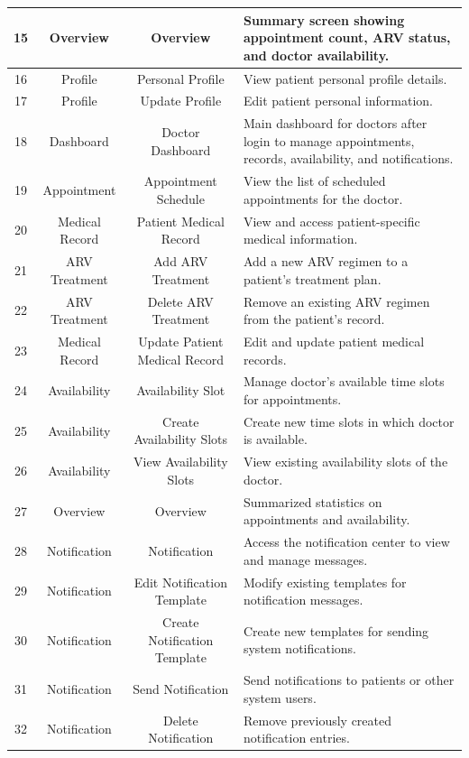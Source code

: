\documentclass[12pt,a4paper]{article}
\begin{document}
\begin{longtable}{|c|c|c|p{8.5cm}|}
\hline
15 & Overview & Overview & Summary screen showing appointment count, ARV status, and doctor availability. \\
\hline
16 & Profile & Personal Profile & View patient personal profile details. \\
\hline
17 & Profile & Update Profile & Edit patient personal information. \\
\hline
18 & Dashboard & Doctor Dashboard & Main dashboard for doctors after login to manage appointments, records, availability, and notifications. \\
\hline
19 & Appointment & Appointment Schedule & View the list of scheduled appointments for the doctor. \\
\hline
20 & Medical Record & Patient Medical Record & View and access patient-specific medical information. \\
\hline
21 & ARV Treatment & Add ARV Treatment & Add a new ARV regimen to a patient's treatment plan. \\
\hline
22 & ARV Treatment & Delete ARV Treatment & Remove an existing ARV regimen from the patient's record. \\
\hline
23 & Medical Record & Update Patient Medical Record & Edit and update patient medical records. \\
\hline
24 & Availability & Availability Slot & Manage doctor's available time slots for appointments. \\
\hline
25 & Availability & Create Availability Slots & Create new time slots in which doctor is available. \\
\hline
26 & Availability & View Availability Slots & View existing availability slots of the doctor. \\
\hline
27 & Overview & Overview & Summarized statistics on appointments and availability. \\
\hline
28 & Notification & Notification & Access the notification center to view and manage messages. \\
\hline
29 & Notification & Edit Notification Template & Modify existing templates for notification messages. \\
\hline
30 & Notification & Create Notification Template & Create new templates for sending system notifications. \\
\hline
31 & Notification & Send Notification & Send notifications to patients or other system users. \\
\hline
32 & Notification & Delete Notification & Remove previously created notification entries. \\

\end{longtable}
\end{document}
